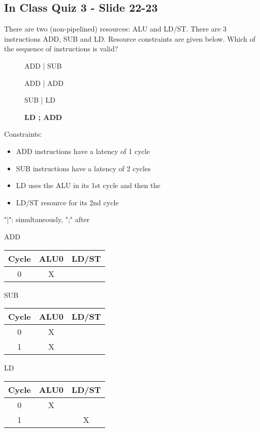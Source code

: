 \documentclass{report}
\newcommand{\cmark}{\ding{51}}%
\newcommand{\xmark}{\ding{55}}%
\begin{document}
\subsection{In Class Quiz 3 - Slide 22-23}
There are two (non-pipelined) resources: ALU and LD/ST. There are
3 instructions ADD, SUB and LD. Resource constraints are given below.
Which of the sequence of instructions is valid?
\vspace{-1em}
\begin{multicols}{2}
  \begin{description}
    \item [\xmark] ADD | SUB
    \item [\xmark] ADD | ADD
    \item [\xmark] SUB | LD
    \item [\cmark] \textbf{LD ; ADD}
  \end{description}
  \vfill\columnbreak
  \setlength{\leftskip}{-8em}
  Constraints:
  \begin{itemize}
    \setlength{\leftskip}{-8em}
    \item ADD instructions have a latency of 1 cycle
    \item SUB instructions have a latency of 2 cycles
    \item LD uses the ALU in its 1st cycle and then the
    \item LD/ST resource for its 2nd cycle
  \end{itemize}
  "|": simultaneously, ";" after
\end{multicols}
\vspace{-2em}
\begin{multicols}{3}
ADD \\
\begin{tabular}{|c|c|c|}
  \hline
  Cycle & ALU0 & LD/ST \\
  \hline
  0     & X    &       \\
  \hline
\end{tabular}
  \vfill\columnbreak
SUB \\
\begin{tabular}{|c|c|c|}
  \hline
  Cycle & ALU0 & LD/ST \\
  \hline
   0    & X    &       \\
  \hline
   1    & X    &       \\
  \hline
\end{tabular}
  \vfill\columnbreak
LD \\
\begin{tabular}{|c|c|c|}
  \hline
  Cycle & ALU0 & LD/ST \\
  \hline
   0    & X    &       \\
  \hline
   1    &      & X     \\
  \hline
\end{tabular}
\end{multicols}
\end{document}
